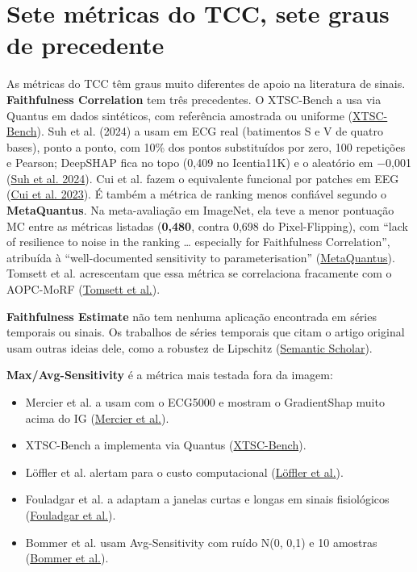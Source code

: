 \documentclass[11pt,a4paper]{article}
\begin{document}
\section{Sete métricas do TCC, sete graus de precedente}

As métricas do TCC têm graus muito diferentes de apoio na literatura de sinais. \textbf{Faithfulness Correlation} tem três precedentes. O XTSC-Bench a usa via Quantus em dados sintéticos, com referência amostrada ou uniforme (\href{https://arxiv.org/abs/2310.14957}{XTSC-Bench}). Suh et al. (2024) a usam em ECG real (batimentos S e V de quatro bases), ponto a ponto, com 10\% dos pontos substituídos por zero, 100 repetições e Pearson; DeepSHAP fica no topo (0,409 no Icentia11K) e o aleatório em −0,001 (\href{https://doi.org/10.1016/j.compbiomed.2024.109088}{Suh et al. 2024}). Cui et al. fazem o equivalente funcional por patches em EEG (\href{https://www.frontiersin.org/journals/computational-neuroscience/articles/10.3389/fncom.2023.1232925/full}{Cui et al. 2023}). É também a métrica de ranking menos confiável segundo o \textbf{MetaQuantus}. Na meta-avaliação em ImageNet, ela teve a menor pontuação MC entre as métricas listadas (\textbf{0,480}, contra 0,698 do Pixel-Flipping), com ``lack of resilience to noise in the ranking … especially for Faithfulness Correlation'', atribuída à ``well-documented sensitivity to parameterisation'' (\href{https://arxiv.org/abs/2302.07265}{MetaQuantus}). Tomsett et al. acrescentam que essa métrica se correlaciona fracamente com o AOPC-MoRF (\href{https://arxiv.org/abs/1912.01451}{Tomsett et al.}).

\textbf{Faithfulness Estimate} não tem nenhuma aplicação encontrada em séries temporais ou sinais. Os trabalhos de séries temporais que citam o artigo original usam outras ideias dele, como a robustez de Lipschitz (\href{https://api.semanticscholar.org/graph/v1/paper/arXiv:1806.07538/citations}{Semantic Scholar}).

\textbf{Max/Avg-Sensitivity} é a métrica mais testada fora da imagem:

\begin{itemize}
\item Mercier et al. a usam com o ECG5000 e mostram o GradientShap muito acima do IG (\href{https://arxiv.org/abs/2202.03759}{Mercier et al.}).
\item XTSC-Bench a implementa via Quantus (\href{https://arxiv.org/abs/2310.14957}{XTSC-Bench}).
\item Löffler et al. alertam para o custo computacional (\href{https://arxiv.org/abs/2203.07861}{Löffler et al.}).
\item Fouladgar et al. a adaptam a janelas curtas e longas em sinais fisiológicos (\href{https://doi.org/10.1109/ACCESS.2022.3155115}{Fouladgar et al.}).
\item Bommer et al. usam Avg-Sensitivity com ruído N(0, 0,1) e 10 amostras (\href{https://arxiv.org/abs/2303.00652}{Bommer et al.}).
\end{itemize}
\end{document}
